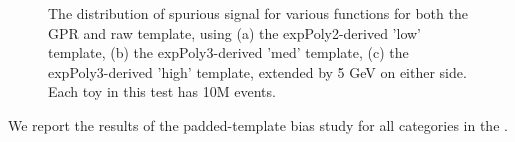 \begin{figure} 
\begin{center}

\caption{The distribution of spurious signal for various functions for both the GPR and raw template, using (a) the expPoly2-derived 'low' template, (b) the expPoly3-derived 'med' template, (c) the expPoly3-derived 'high' template, extended by 5 GeV on either side. Each toy in this test has 10M events.}
\label{fig:padded_lowpt_10M_noSig}
\end{center}
\end{figure}


We report the results of the padded-template bias study for all categories in the \Tab{\ref{tab:NoSigSSpadded}}.


